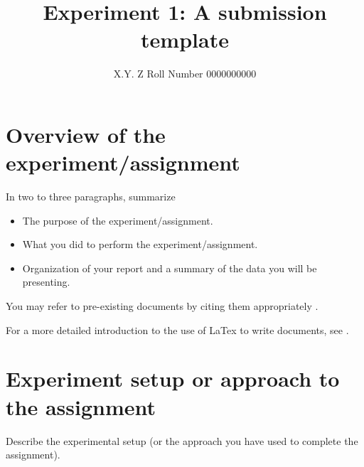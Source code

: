 \documentclass[12pt]{article}
\title{Experiment 1: A submission template}
\author{X.Y.  Z Roll Number 0000000000}
\begin{document}
\maketitle

\section{Overview of the experiment/assignment}

In two to three paragraphs, summarize 
\begin{itemize}
\item The purpose of the experiment/assignment.
\item What you did to perform the experiment/assignment.
\item Organization of your report and a summary of the
data you will be presenting.
\end{itemize}

You may refer to pre-existing documents by
citing them appropriately \cite{ref:Ramayana}.

For a more detailed introduction to the use of
LaTex to write documents, see \cite{ref:LatexTutorial}.

\section{Experiment setup or approach to the assignment}

Describe the experimental setup (or the approach you have used
to complete the assignment).
\end{document}
